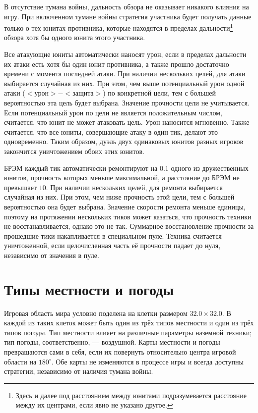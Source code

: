 В отсутствие тумана войны, дальность обзора не оказывает никакого влияния на игру. При включенном тумане войны стратегия участника будет
получать данные только о тех юнитах противника, которые находятся в пределах дальности\footnote[2]{Здесь и далее под расстоянием между
юнитами подразумевается расстояние между их центрами, если явно не указано другое.} обзора хотя бы одного юнита этого участника.

Все атакующие юниты автоматически наносят урон, если в пределах дальности их атаки есть хотя бы один юнит противника, а также прошло
достаточно времени с момента последней атаки. При наличии нескольких целей, для атаки выбирается случайная из них. При этом, чем выше
потенциальный урон одной атаки ($<урон>-<защита>$) по конкретной цели, тем с большей вероятностью эта цель будет выбрана. Значение
прочности цели не учитывается. Если потенциальный урон по цели не является положительным числом, считается, что юнит не может атаковать
цель. Урон наносится мгновенно. Также считается, что все юниты, совершающие атаку в один тик, делают это одновременно. Таким образом, дуэль
двух одинаковых юнитов разных игроков закончится уничтожением обоих этих юнитов.

БРЭМ каждый тик автоматически ремонтируют на $0.1$ одного из дружественных юнитов, прочность которых меньше максимальной, а расстояние до
БРЭМ не превышает $10$. При наличии нескольких целей, для ремонта выбирается случайная из них. При этом, чем ниже прочность этой цели, тем с
большей вероятностью она будет выбрана. Значение скорости ремонта меньше единицы, поэтому на протяжении нескольких тиков может казаться, что
прочность техники не восстанавливается, однако это не так. Суммарное восстановление прочности за прошедшие тики накапливается в специальном
пуле. Техника считается уничтоженной, если целочисленная часть её прочности падает до нуля, независимо от значения в пуле.

\section{Типы местности и погоды}

Игровая область мира условно поделена на клетки размером $32.0\times32.0$. В каждой из таких клеток может быть один из трёх типов местности
и один из трёх типов погоды. Тип местности влияет на различные параметры наземной техники; тип погоды, соответственно, --- воздушной. Карты
местности и погоды превращаются сами в себя, если их повернуть относительно центра игровой области на $180^\circ$. Обе карты не изменяются в
процессе игры и всегда доступны стратегии, независимо от наличия тумана войны.

